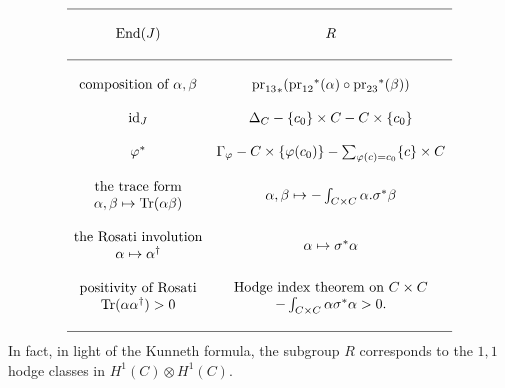 $$
\begin{matrix}
\hline & \\
\text{End}(J) & R \\
& \\
\hline & \\
\text{composition of }\alpha, \beta &
{\text{pr}_{13}}_* ({\text{pr}_{12}}^*(\alpha) \circ {\text{pr}_{23}}^*(\beta))
\\
& \\
\text{id}_J &
\Delta_C - \{c_0\} \times C - C \times \{c_0\} \\
& \\
\varphi^* &
\Gamma_\varphi - C \times \{\varphi(c_0)\}
- \sum_{\varphi(c) = c_0} \{c\} \times C \\
& \\
{
\begin{matrix}
\text{the trace form} \\
\alpha, \beta \mapsto \text{Tr}(\alpha \beta)
\end{matrix}
}
&
\alpha, \beta \mapsto - \int_{C \times C} \alpha . \sigma^*\beta
\\
& \\
{
\begin{matrix}
\text{the Rosati involution} \\
\alpha \mapsto \alpha^\dagger
\end{matrix}
}
&
\alpha \mapsto \sigma^*\alpha
\\
& \\
{
\begin{matrix}
\text{positivity of Rosati} \\
\text{Tr}(\alpha\alpha^\dagger) > 0
\end{matrix}
}
&
{
\begin{matrix}
\text{Hodge index theorem on }C \times C \\
- \int_{C \times C} \alpha \sigma^*\alpha > 0.
\end{matrix}
}
\\
& \\
\hline 
\end{matrix}
$$
In fact, in light of the Kunneth formula, the subgroup $R$ corresponds to the
$1, 1$ hodge classes in $H^1(C)\otimes H^1(C)$.

